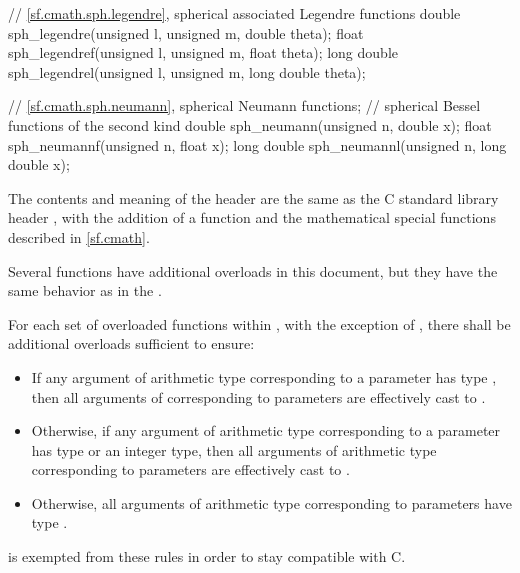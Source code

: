 \begin{codeblock}
{  // \ref{sf.cmath.sph.legendre}, spherical associated Legendre functions
  double       sph_legendre(unsigned l, unsigned m, double theta);
  float        sph_legendref(unsigned l, unsigned m, float theta);
  long double  sph_legendrel(unsigned l, unsigned m, long double theta);

  // \ref{sf.cmath.sph.neumann}, spherical Neumann functions;
  // spherical Bessel functions of the second kind
  double       sph_neumann(unsigned n, double x);
  float        sph_neumannf(unsigned n, float x);
  long double  sph_neumannl(unsigned n, long double x);
}
\end{codeblock}

\pnum
The contents and meaning of the header 
are the same as the C standard library header ,
with the addition of
a  function and
the mathematical special functions described in \ref{sf.cmath}.
\begin{note}
Several functions have additional overloads in this document,
but they have the same behavior as in the .
\end{note}

\pnum
For each set of overloaded functions within ,
with the exception of ,
there shall be additional overloads sufficient to ensure:
\begin{itemize}
  \item If any argument of arithmetic type
    corresponding to a  parameter
    has type ,
    then all arguments of 
    corresponding to  parameters
    are effectively cast to .
  \item Otherwise, if any argument of arithmetic type
    corresponding to a  parameter
    has type 
    or an integer type,
    then all arguments of arithmetic type
    corresponding to  parameters
    are effectively cast to .
  \item
\begin{note}
Otherwise, all arguments of arithmetic type
corresponding to  parameters
have type .
\end{note}
\end{itemize}
\begin{note}
 is exempted from these rules in order to stay compatible with C.
\end{note}

